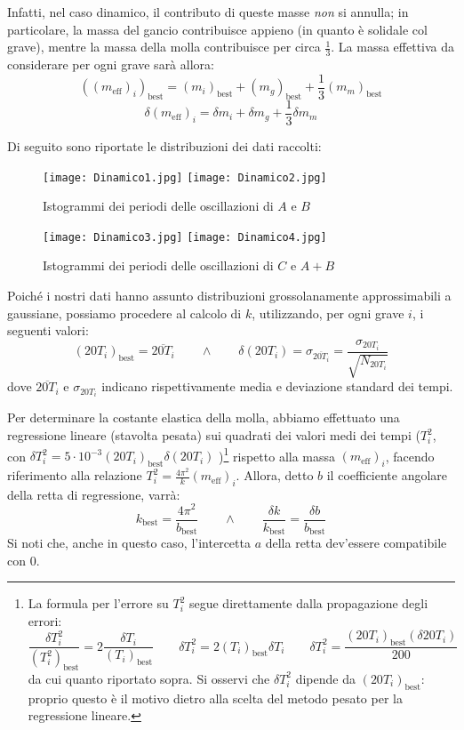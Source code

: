 \documentclass{article}
\newcommand*{\best}[1]{{#1}_\text{best}}
\begin{document}
Infatti, nel caso dinamico, il contributo di queste masse
\emph{non} si annulla; in particolare, la massa del gancio
contribuisce appieno (in quanto è solidale col grave),
mentre la massa della molla contribuisce per circa
$\frac{1}{3}$. La massa effettiva da considerare per ogni grave
sarà allora:
\[\best{\left(\left(m_\text{eff}\right)_i\right)} = \best{\left(m_i\right)} + \best{\left(m_g\right)} + \frac{1}{3}\best{\left(m_m\right)}\]
\[\delta \left(m_\text{eff}\right)_i = \delta m_i + \delta m_g + \frac{1}{3}\delta m_m\]

Di seguito sono riportate le distribuzioni dei dati raccolti:

\begin{figure}[H]
    \texttt{[image: Dinamico1.jpg]}
    \texttt{[image: Dinamico2.jpg]}
    \caption{Istogrammi dei periodi delle oscillazioni di $A$ e $B$}
\end{figure}\begin{figure}[H]
    \texttt{[image: Dinamico3.jpg]}
    \texttt{[image: Dinamico4.jpg]}
    \caption{Istogrammi dei periodi delle oscillazioni di $C$ e $A+B$}
\end{figure}

Poiché i nostri dati hanno assunto distribuzioni grossolanamente
approssimabili a gaussiane, possiamo procedere al calcolo di $k$,
utilizzando, per ogni grave $i$, i seguenti valori:
\[
    \left(20T_i\right)_\text{best} = \overline{20T_i}
    \qquad\wedge\qquad
    \delta\left(20T_i\right) =
    \sigma_{\overline{20T_i}} =
    \frac{\sigma_{20T_i}}{\sqrt{N_{20T_i}}}
\]
dove $\overline{20T_i}$ e $\sigma_{20T_i}$ indicano rispettivamente
media e deviazione standard dei tempi.

Per determinare la costante elastica della molla, abbiamo effettuato
una regressione lineare (stavolta pesata) sui quadrati dei valori medi
dei tempi ($T_i^2$, con
$\delta T_i^2 = 5 \cdot 10^{-3} (20 T_i)_\text{best} \delta(20 T_i)$
)\footnote[2]{
    La formula per l'errore su $T_i^2$ segue direttamente dalla
    propagazione degli errori:
    \[
        \frac{\delta T_i^2}{\left(T_i^2\right)_\text{best}} = 2\frac{\delta T_i}{{\left(T_i\right)}_\text{best}}
        \qquad
        \delta T_i^2 = 2\left(T_i\right)_\text{best}\delta T_i
        \qquad
        \delta T_i^2 = \frac{\left(20T_i\right)_\text{best}(\delta 20T_i)}{200}
    \]
    da cui quanto riportato sopra.
    Si osservi che $\delta T_i^2$ dipende da
    $\left(20T_i\right)_\text{best}$:
    proprio questo è il motivo dietro alla scelta del metodo pesato
    per la regressione lineare.
} rispetto alla massa $\left(m_\text{eff}\right)_i$, facendo riferimento
alla relazione $T_i^2 = \frac{4\pi^2}{k} \left(m_\text{eff}\right)_i$. Allora, detto $b$ il
coefficiente angolare della retta di regressione, varrà:
\[
    k_\text{best}=\frac{4\pi^2}{b_\text{best}}
    \qquad\wedge\qquad
    \frac{\delta k}{k_\text{best}}=\frac{\delta b}{b_\text{best}}
\]
Si noti che, anche in questo caso, l'intercetta $a$ della retta dev'essere
compatibile con $0$.
\end{document}
